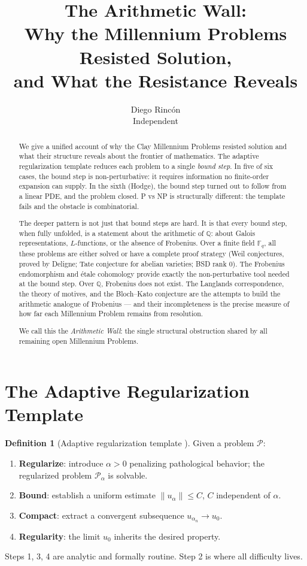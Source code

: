 \documentclass[12pt]{article}
\title{The Arithmetic Wall:\\
Why the Millennium Problems Resisted Solution,\\
and What the Resistance Reveals}
\author{Diego Rinc\'on\\
\small Independent}
\date{}
\theoremstyle{definition}
\newtheorem{definition}[theorem]{Definition}
\theoremstyle{remark}
\begin{document}
\maketitle

\begin{abstract}
We give a unified account of why the Clay Millennium Problems resisted
solution and what their structure reveals about the frontier of mathematics.
The adaptive regularization template \cite{hard} reduces each problem to a
single \emph{bound step}. In five of six cases, the bound step is
non-perturbative: it requires information no finite-order expansion
can supply. In the sixth (Hodge), the bound step turned out to follow from a
linear PDE, and the problem closed. P vs NP is structurally different: the
template fails and the obstacle is combinatorial.

The deeper pattern is not just that bound steps are hard.
It is that every bound step, when fully unfolded, is a statement about the
arithmetic of $\mathbb{Q}$: about Galois representations, $L$-functions,
or the absence of Frobenius. Over a finite field $\mathbb{F}_q$, all these
problems are either solved or have a complete proof strategy (Weil conjectures,
proved by Deligne; Tate conjecture for abelian varieties; BSD rank $0$).
The Frobenius endomorphism and étale cohomology provide exactly the
non-perturbative tool needed at the bound step. Over $\mathbb{Q}$, Frobenius
does not exist. The Langlands correspondence, the theory of motives, and the
Bloch--Kato conjecture are the attempts to build the arithmetic analogue
of Frobenius --- and their incompleteness is the precise measure of how far
each Millennium Problem remains from resolution.

We call this the \emph{Arithmetic Wall}: the single structural obstruction
shared by all remaining open Millennium Problems.
\end{abstract}

\tableofcontents

\section{The Adaptive Regularization Template}

\begin{definition}[Adaptive regularization template \cite{hard}]
Given a problem $\mathcal{P}$:
\begin{enumerate}
\item \textbf{Regularize}: introduce $\alpha > 0$ penalizing pathological behavior;
  the regularized problem $\mathcal{P}_\alpha$ is solvable.
\item \textbf{Bound}: establish a uniform estimate $\|u_\alpha\|\leq C$,
  $C$ independent of $\alpha$.
\item \textbf{Compact}: extract a convergent subsequence $u_{\alpha_n}\to u_0$.
\item \textbf{Regularity}: the limit $u_0$ inherits the desired property.
\end{enumerate}
Steps 1, 3, 4 are analytic and formally routine. Step 2 is where all
difficulty lives.
\end{definition}
\end{document}
